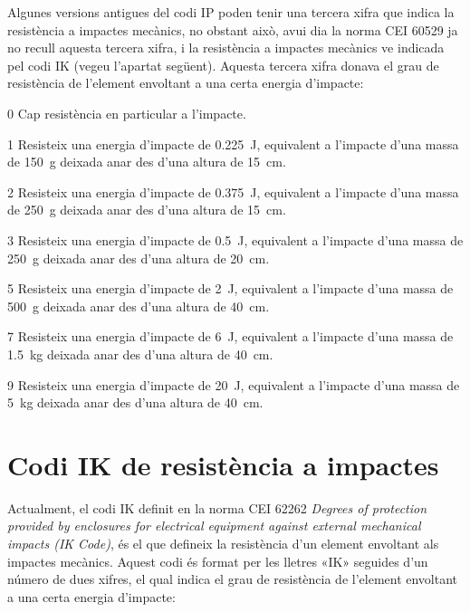 Algunes versions antigues del codi IP poden tenir una tercera xifra que indica la resistència a impactes mecànics, no obstant això, avui  dia la norma CEI 60529 ja no recull aquesta tercera xifra, i la resistència a impactes mecànics ve indicada pel codi IK (vegeu l'apartat següent). Aquesta tercera xifra donava el grau de resistència de l'element envoltant a una certa energia d'impacte:
\begin{list}{}
   {\setlength{\labelwidth}{10mm} \setlength{\leftmargin}{15mm} \setlength{\labelsep}{5mm}}
   \item[0] Cap resistència en particular a l'impacte.
   \item[1] Resisteix una energia d'impacte de \qty{0,225}{J}, equivalent a l'impacte d'una massa de \qty{150}{g} deixada anar des d'una altura de \qty{15}{cm}.
   \item[2] Resisteix una energia d'impacte de \qty{0,375}{J}, equivalent a l'impacte d'una massa de \qty{250}{g} deixada anar des d'una altura de \qty{15}{cm}.
   \item[3] Resisteix una energia d'impacte de \qty{0,5}{J}, equivalent a l'impacte d'una massa de \qty{250}{g} deixada anar des d'una altura de \qty{20}{cm}.
   \item[5] Resisteix una energia d'impacte de \qty{2}{J}, equivalent a l'impacte d'una massa de \qty{500}{g} deixada anar des d'una altura de \qty{40}{cm}.
   \item[7] Resisteix una energia d'impacte de \qty{6}{J}, equivalent a l'impacte d'una massa de \qty{1,5}{kg} deixada anar des d'una altura de \qty{40}{cm}.
   \item[9]Resisteix una energia d'impacte de \qty{20}{J}, equivalent a l'impacte d'una massa de \qty{5}{kg} deixada anar des d'una altura de \qty{40}{cm}.
\end{list}

\section{Codi IK de resistència a impactes}\label{sec:codi-IK}   

Actualment, el codi IK definit en la norma CEI 62262 \textit{Degrees of protection provided by enclosures for electrical equipment against external mechanical impacts (IK Code)}, és el que defineix la resistència d'un element  envoltant als impactes mecànics. Aquest codi és format per les lletres «IK» seguides d'un número de dues xifres, el qual indica el grau de resistència de l'element envoltant a una certa energia d'impacte:

